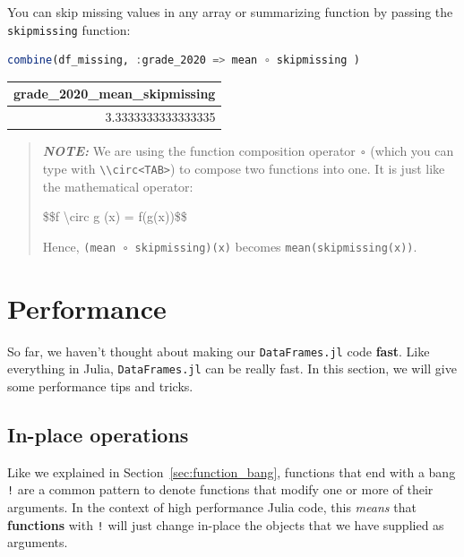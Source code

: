\documentclass[
  notoc %
]{tufte-book}
\newcommand{\passthrough}[1]{#1}
\begin{document}
You can skip missing values in any array or summarizing function by
passing the \passthrough{\lstinline!skipmissing!} function:

\begin{lstlisting}[language=Julia]
combine(df_missing, :grade_2020 => mean ∘ skipmissing )
\end{lstlisting}

\begin{longtable}[]{@{}r@{}}
\toprule
grade\_2020\_mean\_skipmissing \\
\midrule
\endhead
3.3333333333333335 \\
\bottomrule
\end{longtable}

\begin{quote}
\textbf{\emph{NOTE:}} We are using the function composition operator
\passthrough{\lstinline!∘!} (which you can type with
\passthrough{\lstinline!\\circ<TAB>!}) to compose two functions into
one. It is just like the mathematical operator:

\$\$f \textbackslash circ g (x) = f(g(x))\$\$

Hence, \passthrough{\lstinline!(mean ∘ skipmissing)(x)!} becomes
\passthrough{\lstinline!mean(skipmissing(x))!}.
\end{quote}

\hypertarget{sec:df_performance}{%
\section{Performance}\label{sec:df_performance}}

So far, we haven't thought about making our
\passthrough{\lstinline!DataFrames.jl!} code \textbf{fast}. Like
everything in Julia, \passthrough{\lstinline!DataFrames.jl!} can be
really fast. In this section, we will give some performance tips and
tricks.

\hypertarget{sec:df_performance_inplace}{%
\subsection{In-place operations}\label{sec:df_performance_inplace}}

Like we explained in Section~\ref{sec:function_bang}, functions that end
with a bang \passthrough{\lstinline"!"} are a common pattern to denote
functions that modify one or more of their arguments. In the context of
high performance Julia code, this \emph{means} that \textbf{functions}
with \passthrough{\lstinline"!"} will just change in-place the objects
that we have supplied as arguments.
\end{document}
